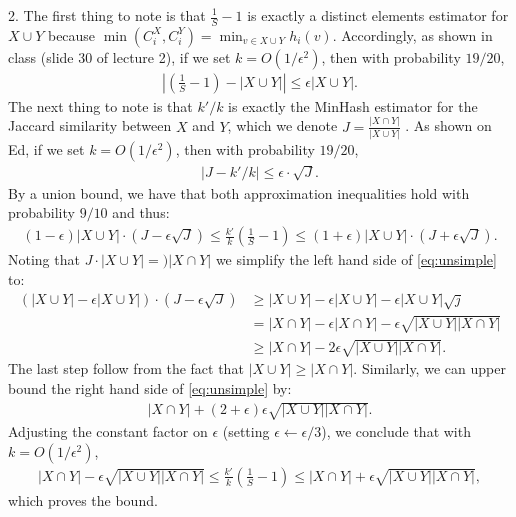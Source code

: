 \documentclass[11pt]{article}
\begin{document}
\vspace{.5em}
2. The first thing to note is that $\frac{1}{S} - 1$ is exactly a distinct elements estimator for $X\cup Y$ because $\min(C_i^X, C_i^Y) = \min_{v \in X \cup Y} h_i(v)$. Accordingly, as shown in class (slide 30 of lecture 2), if we set $k = O(1/\epsilon^2)$, then with probability $19/20$, 
\begin{align*}
	\left|\left(\frac{1}{S} - 1\right) - |X\cup Y|\right| \leq \epsilon  |X\cup Y|. 
\end{align*}
The next thing to note is that $k'/k$ is exactly the MinHash estimator for the Jaccard similarity between $X$ and $Y$, which we denote $J = \frac{|X\cap Y|}{|X\cup Y|}$ . As shown on Ed, if we set $k = O(1/\epsilon^2)$, then with probability $19/20$, 
\begin{align*}
	\left|J - k'/k \right|\leq \epsilon \cdot \sqrt{J}. 
\end{align*}
By a union bound, we have that both approximation inequalities hold with probability $9/10$ and thus:
\begin{align}
	\label{eq:unsimple}
	(1-\epsilon)|X\cup Y|\cdot (J - \epsilon \sqrt{J}) \leq \frac{k'}{k}\left(\frac{1}{S} - 1\right)\leq (1+\epsilon)|X\cup Y|\cdot (J + \epsilon \sqrt{J}).
\end{align}
Noting that $J \cdot|X\cup Y| = )|X\cap Y|$ we simplify the left hand side of \eqref{eq:unsimple} to:
\begin{align*}
	(|X\cup Y|-\epsilon|X\cup Y|)\cdot (J - \epsilon \sqrt{J}) &\geq |X\cup Y| -\epsilon |X\cup Y|  - \epsilon |X\cup Y|\sqrt{j} \\
	& = |X\cap Y| -\epsilon |X\cap Y|  - \epsilon \sqrt{|X\cup Y||X\cap Y|} \\
	&\geq |X\cap Y|  - 2 \epsilon \sqrt{|X\cup Y||X\cap Y|}.
\end{align*}
The last step follow from the fact that $|X\cup Y| \geq  |X\cap Y|$. 
Similarly, we can upper bound the right hand side of \eqref{eq:unsimple} by:
\begin{align*}
	|X\cap Y|  + (2+\epsilon) \epsilon \sqrt{|X\cup Y||X\cap Y|}. 
\end{align*}
Adjusting the constant factor on $\epsilon$ (setting $\epsilon \gets \epsilon/3$), we conclude that with $k = O(1/\epsilon^2)$, 
\begin{align*}
		|X\cap Y|  - \epsilon \sqrt{|X\cup Y||X\cap Y|}\leq \frac{k'}{k}\left(\frac{1}{S} - 1\right)\leq 	|X\cap Y|  + \epsilon \sqrt{|X\cup Y||X\cap Y|}, 
\end{align*}
which proves the bound. 
\end{document}
